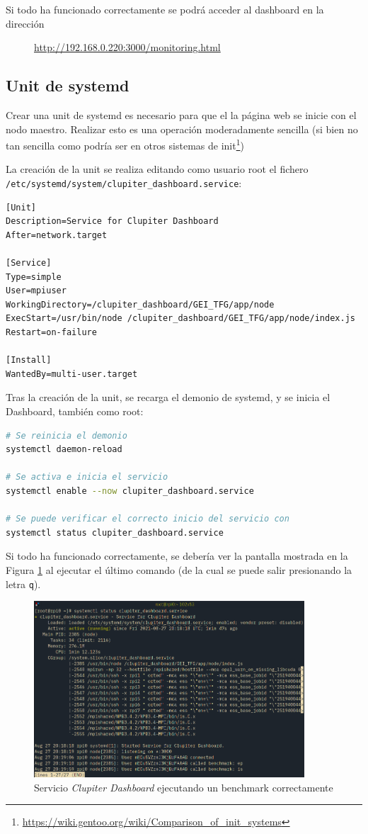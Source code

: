 Si todo ha funcionado correctamente se podrá acceder al dashboard en la dirección

\begin{figure}[H]
    \vspace{0.2cm}
    \centering
    \url{http://192.168.0.220:3000/monitoring.html}
\end{figure}


\subsection{Unit de systemd}
Crear una unit de systemd es necesario para que el la página web se inicie con el nodo maestro. Realizar esto es una operación moderadamente sencilla (si bien no tan sencilla como podría ser en otros sistemas de init\footnote{\url{https://wiki.gentoo.org/wiki/Comparison_of_init_systems}}) 

La creación de la unit se realiza editando como usuario root el fichero \texttt{/etc/systemd/system/clupiter\_dashboard.service}:

\begin{lstlisting}[]
[Unit]
Description=Service for Clupiter Dashboard
After=network.target

[Service]
Type=simple
User=mpiuser
WorkingDirectory=/clupiter_dashboard/GEI_TFG/app/node
ExecStart=/usr/bin/node /clupiter_dashboard/GEI_TFG/app/node/index.js
Restart=on-failure

[Install]
WantedBy=multi-user.target
\end{lstlisting}

Tras la creación de la unit, se recarga el demonio de systemd, y se inicia el Dashboard, también como root:
\begin{lstlisting}[language=bash]
# Se reinicia el demonio
systemctl daemon-reload

# Se activa e inicia el servicio
systemctl enable --now clupiter_dashboard.service

# Se puede verificar el correcto inicio del servicio con
systemctl status clupiter_dashboard.service
\end{lstlisting}

Si todo ha funcionado correctamente, se debería ver la pantalla mostrada en la Figura \ref{fig:systemd_clupiter_dashboard} al ejecutar el último comando (de la cual se puede salir presionando la letra \texttt{q}).

\begin{figure}[h!]
  \centering
  \vspace*{0.5cm}
  \includegraphics[width=0.9\textwidth]{img/systemd_clupiter_dashboard.png}
  \caption{Servicio \textit{Clupiter Dashboard} ejecutando un benchmark correctamente}
  \label{fig:systemd_clupiter_dashboard}
\end{figure}
